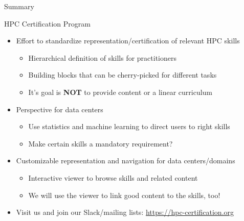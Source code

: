 \documentclass[compress,aspectratio=169]{beamer}
\begin{document}
\begin{frame}{Summary}

	\begin{block}{HPC Certification Program}
		\begin{itemize}
			\item Effort to standardize representation/certification of relevant HPC skills
      \begin{itemize}
        \item Hierarchical definition of skills for practitioners
        \item Building blocks that can be cherry-picked for different tasks
				\item It's goal is \textbf{NOT} to provide content or a linear curriculum
      \end{itemize}
			\item Perspective for data centers
				\begin{itemize}
					\item Use statistics and machine learning to direct users to right skills
					\item Make certain skills a mandatory requirement?
				\end{itemize}
			\item Customizable representation and navigation for data centers/domains
      \begin{itemize}
        \item Interactive viewer to browse skills and related content
				\item We will use the viewer to link good content to the skills, too!
      \end{itemize}
      \item Visit us and join our Slack/mailing lists: \url{https://hpc-certification.org}
		\end{itemize}
	\end{block}
\end{frame}
\end{document}
